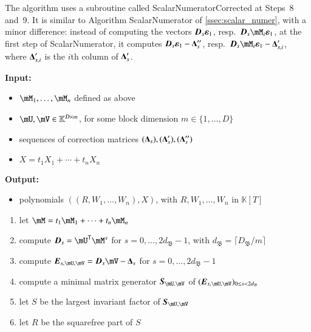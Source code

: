 \documentclass[final,1p,times,authoryear]{elsarticle}
\newcommand{\mat}[1]{\bm{\MakeUppercase{#1}}} %
\newcommand{\col}[1]{\bm{\MakeLowercase{#1}}} %
\newcommand{\mainalgoname}{\mathsf{ BlockParametrization}}
\newcommand{\lf}{X}
\newcommand{\trsp}[1]{#1^{\mathsf{T}}} %
\def\K{\mathbb{K}}
\def\K {\ensuremath{\mathbb{K}}}
\newcommand{\mUt}{\trsp{\mU}}
\begin{document}
The algorithm uses a subroutine called {\sf ScalarNumeratorCorrected}
at Steps~8 and~9.  It is similar to Algorithm {\sf ScalarNumerator} of
\cref{ssec:scalar_numer}, with a minor difference: instead of computing the
vectors $\mat{D}_s \col{\varepsilon}_1$, resp.\ $\mat{D}_s\mM_i
\col{\varepsilon}_1$, at the first step of  {\sf ScalarNumerator}, it computes $\mat{D}_s
\col{\varepsilon}_1-\mat{\Delta}''_s$, resp.\ $\mat{D}_s\mM_i
\col{\varepsilon}_1-\mat{\Delta}'_{s,i}$, where $\mat{\Delta}'_{s,i}$
is the $i$th column of $\mat{\Delta}'_{s}$.

\begin{algorithm}[ht]
  \caption{$\mainalgoname{\sf Residual}(\mM_1,\dots,\mM_n,\mU,\mV,(\mat{\Delta}_s),(\mat{\Delta}'_s),(\mat{\Delta}''_s),\lf)$}
  {\bf Input:} \vspace{-0.5em}
  \begin{itemize}
    \item $\mM_1,\dots,\mM_n$ defined as above
    \item  $\mU,\mV \in \mathbb{K}^{D \times m}$, for some block dimension  $m \in \{1,\dots,D\}$
    \item sequences of correction matrices $(\mat{\Delta}_s),(\mat{\Delta}'_s),(\mat{\Delta}''_s)$
    \item $\lf =t_1 X_1 + \cdots + t_n X_n$
  \end{itemize}
  {\bf Output:}  \vspace{-0.5em}
  \begin{itemize}
    \item  polynomials $((R,W_1,\dots,W_n),\lf)$, with $R,W_1,\dots,W_n$ in $\K[T]$
  \end{itemize}
  \begin{enumerate}
    \item\label{residualstep1}   let $\mM = t_1 \mM_1 + \cdots + t_n \mM_n$
    \item\label{residualstep3} { compute $\mat{D}_s = \mUt\mM^s$ for $s=0,\dots,2d_\mathfrak{B}-1$, with $d_\mathfrak{B} = \lceil D_\mathfrak{B}/m \rceil$}
    \item\label{residualstep4} { compute $\mat{E}_{s,\mU,\mV}= \mat{D}_s\mV-\mat{\Delta}_s$ for $s=0,\dots, 2d_\mathfrak{B}-1$}
    \item\label{residualstep5} { compute a minimal matrix generator $\mat{S}_{\mU,\mV}$ of $(\mat{E}_{s,\mU,\mV})_{0 \le s < 2d_\mathfrak{B}}$}
    \item\label{residualstep6} { let $S$ be the largest invariant factor of $\mat{S}_{\mU,\mV}$}
    \item\label{residualstep7} { let $R$ be  the squarefree part  of $S$}

\end{enumerate}
\end{algorithm}
\end{document}
